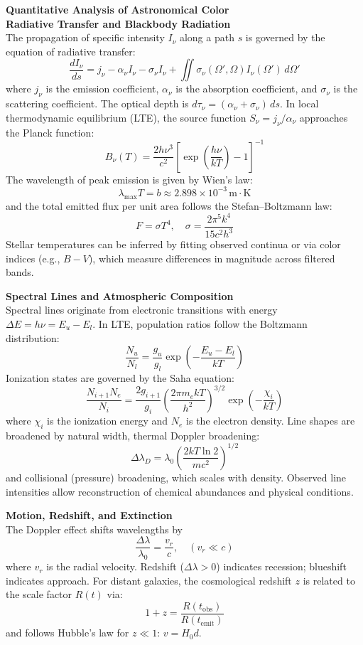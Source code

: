 \begin{technical}
{\Large\textbf{Quantitative Analysis of Astronomical Color}}\\[0.3em]


\noindent\textbf{Radiative Transfer and Blackbody Radiation}\\[0.2em]
The propagation of specific intensity \( I_\nu \) along a path \( s \) is governed by the equation of radiative transfer:
\[
\frac{dI_\nu}{ds} = j_\nu - \alpha_\nu I_\nu - \sigma_\nu I_\nu + \iint \sigma_\nu(\Omega', \Omega) I_\nu(\Omega')\, d\Omega'
\]
where \( j_\nu \) is the emission coefficient, \( \alpha_\nu \) is the absorption coefficient, and \( \sigma_\nu \) is the scattering coefficient. The optical depth is \( d\tau_\nu = (\alpha_\nu + \sigma_\nu)\, ds \). In local thermodynamic equilibrium (LTE), the source function \( S_\nu = j_\nu/\alpha_\nu \) approaches the Planck function:
\[
B_\nu(T) = \frac{2h\nu^3}{c^2} \left[ \exp\left( \frac{h\nu}{kT} \right) - 1 \right]^{-1}
\]
The wavelength of peak emission is given by Wien's law:
\[
\lambda_{\text{max}} T = b \approx 2.898 \times 10^{-3} \, \text{m} \cdot \text{K}
\]
and the total emitted flux per unit area follows the Stefan--Boltzmann law:
\[
F = \sigma T^4, \quad \sigma = \frac{2\pi^5 k^4}{15c^2 h^3}
\]
Stellar temperatures can be inferred by fitting observed continua or via color indices (e.g., \( B-V \)), which measure differences in magnitude across filtered bands.

\noindent\textbf{Spectral Lines and Atmospheric Composition}\\[0.2em]
Spectral lines originate from electronic transitions with energy \( \Delta E = h\nu = E_u - E_l \). In LTE, population ratios follow the Boltzmann distribution:
\[
\frac{N_u}{N_l} = \frac{g_u}{g_l} \exp\left( -\frac{E_u - E_l}{kT} \right)
\]
Ionization states are governed by the Saha equation:
\[
\frac{N_{i+1} N_e}{N_i} = \frac{2 g_{i+1}}{g_i} \left( \frac{2\pi m_e kT}{h^2} \right)^{3/2} \exp\left( -\frac{\chi_i}{kT} \right)
\]
where \( \chi_i \) is the ionization energy and \( N_e \) is the electron density. Line shapes are broadened by natural width, thermal Doppler broadening:
\[
\Delta \lambda_D = \lambda_0 \left( \frac{2kT \ln 2}{mc^2} \right)^{1/2}
\]
and collisional (pressure) broadening, which scales with density. Observed line intensities allow reconstruction of chemical abundances and physical conditions.

\noindent\textbf{Motion, Redshift, and Extinction}\\[0.2em]
The Doppler effect shifts wavelengths by
\[
\frac{\Delta \lambda}{\lambda_0} = \frac{v_r}{c}, \quad (v_r \ll c)
\]
where \( v_r \) is the radial velocity. Redshift (\( \Delta \lambda > 0 \)) indicates recession; blueshift indicates approach. For distant galaxies, the cosmological redshift \( z \) is related to the scale factor \( R(t) \) via:
\[
1 + z = \frac{R(t_{\text{obs}})}{R(t_{\text{emit}})}
\]
and follows Hubble's law for \( z \ll 1 \): \( v = H_0 d \).


\end{technical}
